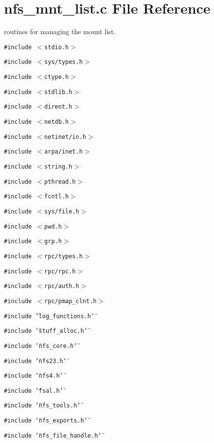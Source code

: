 \section{nfs\_\-mnt\_\-list.c File Reference}
\label{nfs__mnt__list_8c}
routines for managing the mount list. 

{\tt \#include $<$stdio.h$>$}\par
{\tt \#include $<$sys/types.h$>$}\par
{\tt \#include $<$ctype.h$>$}\par
{\tt \#include $<$stdlib.h$>$}\par
{\tt \#include $<$dirent.h$>$}\par
{\tt \#include $<$netdb.h$>$}\par
{\tt \#include $<$netinet/in.h$>$}\par
{\tt \#include $<$arpa/inet.h$>$}\par
{\tt \#include $<$string.h$>$}\par
{\tt \#include $<$pthread.h$>$}\par
{\tt \#include $<$fcntl.h$>$}\par
{\tt \#include $<$sys/file.h$>$}\par
{\tt \#include $<$pwd.h$>$}\par
{\tt \#include $<$grp.h$>$}\par
{\tt \#include $<$rpc/types.h$>$}\par
{\tt \#include $<$rpc/rpc.h$>$}\par
{\tt \#include $<$rpc/auth.h$>$}\par
{\tt \#include $<$rpc/pmap\_\-clnt.h$>$}\par
{\tt \#include \char`\"{}log\_\-functions.h\char`\"{}}\par
{\tt \#include \char`\"{}stuff\_\-alloc.h\char`\"{}}\par
{\tt \#include \char`\"{}nfs\_\-core.h\char`\"{}}\par
{\tt \#include \char`\"{}nfs23.h\char`\"{}}\par
{\tt \#include \char`\"{}nfs4.h\char`\"{}}\par
{\tt \#include \char`\"{}fsal.h\char`\"{}}\par
{\tt \#include \char`\"{}nfs\_\-tools.h\char`\"{}}\par
{\tt \#include \char`\"{}nfs\_\-exports.h\char`\"{}}\par
{\tt \#include \char`\"{}nfs\_\-file\_\-handle.h\char`\"{}}\par
